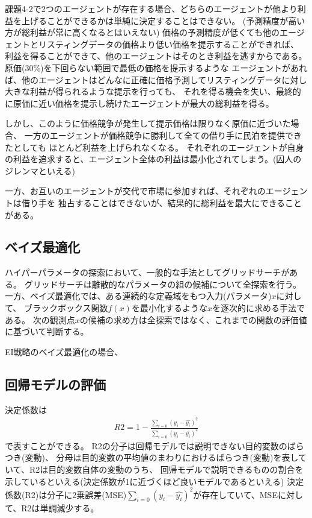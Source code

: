 \documentclass{jsarticle}
\begin{document}
課題4-2で2つのエージェントが存在する場合、どちらのエージェントが他より利益を上げることができるかは単純に決定することはできない。
(予測精度が高い方が総利益が常に高くなるとはいえない)
価格の予測精度が低くても他のエージェントとリスティングデータの価格より低い価格を提示することができれば、
利益を得ることができて、他のエージェントはそのとき利益を逃すからである。原価(30\%)を下回らない範囲で最低の価格を提示するような
エージェントがあれば、他のエージェントはどんなに正確に価格予測してリスティングデータに対し大きな利益が得られるような提示を行っても、
それを得る機会を失い、最終的に原価に近い価格を提示し続けたエージェントが最大の総利益を得る。

しかし、このように価格競争が発生して提示価格は限りなく原価に近づいた場合、
一方のエージェントが価格競争に勝利して全ての借り手に民泊を提供できたとしても
ほとんど利益を上げられなくなる。
それぞれのエージェントが自身の利益を追求すると、エージェント全体の利益は最小化されてしまう。(囚人のジレンマといえる)

一方、お互いのエージェントが交代で市場に参加すれば、それぞれのエージェントは借り手を
独占することはできないが、結果的に総利益を最大にできることがある。

\subsection{ベイズ最適化}
ハイパーパラメータの探索において、一般的な手法としてグリッドサーチがある。
グリッドサーチは離散的なパラメータの組の候補について全探索を行う。
一方、ベイズ最適化では、ある連続的な定義域をもつ入力(パラメータ)$x$に対して、
ブラックボックス関数$f(x)$を最小化するような$x$を逐次的に求める手法である。
次の観測点$x$の候補の求め方は全探索ではなく、これまでの関数の評価値に基づいて判断する。

EI戦略のベイズ最適化の場合、
\subsection{回帰モデルの評価}
決定係数は
\begin{eqnarray}
R2 = 1 - \frac{\sum_{i=0} (y_i - \hat{y_i})^2}{\sum_{i=0} (y_i - \bar{y_i})^2}
\end{eqnarray}
で表すことができる。
R2の分子は回帰モデルでは説明できない目的変数のばらつき(変動)、
分母は目的変数の平均値のまわりにおけるばらつき(変動)を表していて、R2は目的変数自体の変動のうち、
回帰モデルで説明できるものの割合を示しているといえる(決定係数が1に近づくほど良いモデルであるといえる)
決定係数(R2)は分子に2乗誤差(MSE)$\sum_{i=0} (y_i - \hat{y_i})^2$が存在していて、MSEに対して、R2は単調減少する。
\end{document}
